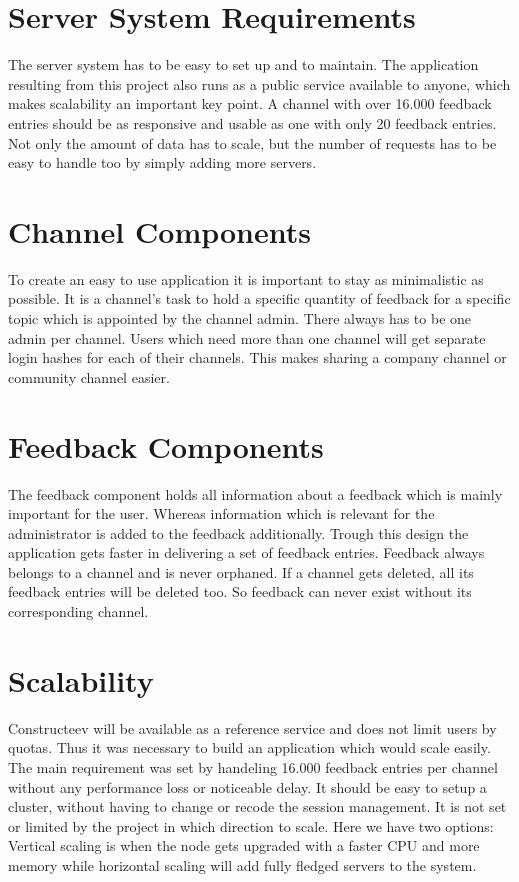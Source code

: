 \section{Server System Requirements}
The server system has to be easy to set up and to maintain. The application resulting from this project also runs as a public service available to anyone, which makes scalability an important key point. A channel with over 16.000 feedback entries should be as responsive and usable as one with only 20 feedback entries. 
Not only the amount of data has to scale, but the number of requests has to be easy to handle too by simply adding more servers. 

\section{Channel Components}
To create an easy to use application it is important to stay as minimalistic as possible. It is a channel's task to hold a specific quantity of feedback for a specific topic which is appointed by the channel admin. There always has to be one admin per channel. Users which need more than one channel will get separate login hashes for each of their channels. This makes sharing a company channel or community channel easier. 

\section{Feedback Components}
The feedback component holds all information about a feedback which is mainly important for the user. Whereas information which is relevant for the administrator is added to the feedback additionally. Trough this design the application gets faster in delivering a set of feedback entries. Feedback always belongs to a channel and is never orphaned. If a channel gets deleted, all its feedback entries will be deleted too. So feedback can never exist without its corresponding channel.

\section{Scalability}
Constructeev will be available as a reference service and does not limit users by quotas. Thus it was necessary to build an application which would scale easily. The main requirement was set by handeling 16.000 feedback entries  per channel without any performance loss or noticeable delay. It should be easy to setup a cluster, without having to change or recode the session management. It is not set or limited by the project in which direction to scale. Here we have two options: Vertical scaling is when the node gets upgraded with a faster CPU and more memory while horizontal scaling will add fully fledged servers to the system.


